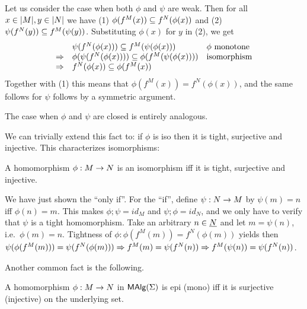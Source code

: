 \documentclass[10pt]{article}
\begin{document}
\begin{Proof}
Let us consider the case when both $\phi$ and $\psi$ are weak. Then
for all $x\in |M|, y\in |N|$ we have (1) $\phi(f^M(x))\subseteq
f^N(\phi(x))$ and (2) $\psi(f^N(y))\subseteq f^M(\psi(y))$.  Substituting
$\phi(x)$ for $y$ in (2), we get
\[
\begin{array}{lll}
      & {\psi(f^N(\phi(x))) \subseteq f^M(\psi(\phi(x)))} 
      & \phi\ {\rm monotone} \\
\Rightarrow & \phi(\psi(f^N(\phi(x)))) \subseteq \phi(f^M(\psi(\phi(x)))) 
      & {\rm isomorphism} \\
\Rightarrow & f^N(\phi(x)) \subseteq \phi(f^M(x))
\end{array} 
\]
Together with (1) this means that $\phi(f^M(x)) = f^N(\phi(x))$, and
the same follows for $\psi$ follows by a symmetric argument.

The case when $\phi$ and $\psi$ are closed is entirely analogous.
\end{Proof}

\noindent
We can trivially extend this fact to: if $\phi$ is iso then it is
tight, surjective and injective. This characterizes isomorphisms:

\begin{Prop}
A homomorphism $\phi:M\rightarrow N$ is an isomorphism iff it is tight,
surjective and injective.
\end{Prop}

\begin{Proof}
We have just shown the ``only if''. For the ``if'', define
$\psi:N\rightarrow M$ by $\psi(m)=n$ iff $\phi(n)=m$. This makes
$\phi;\psi=id_M$ and $\psi;\phi=id_N$, and we only have to verify that
$\psi$ is a tight homomorphism. Take an arbitrary $n\in\underline {N}$ and
let $m=\psi(n)$, i.e.\ $\phi(m)=n$. Tightness of $\phi: \phi(f^M(m))=
f^N(\phi(m))$ yields then $\psi(\phi(f^M(m)))= \psi(f^N(\phi(m)))
\Rightarrow f^M(m)=\psi(f^N(n)) \Rightarrow f^M(\psi(n))=\psi(f^N(n))$.
\end{Proof}

\noindent
Another common fact is the following.

\begin{Prop}
\label{fa:epimono}
A homomorphism $\phi : M \rightarrow N$ in $\mbox{\rm\sf MAlg}(\Sigma)$ is epi (mono) iff it
is surjective (injective) on the underlying set. 
\end{Prop}
\end{document}
